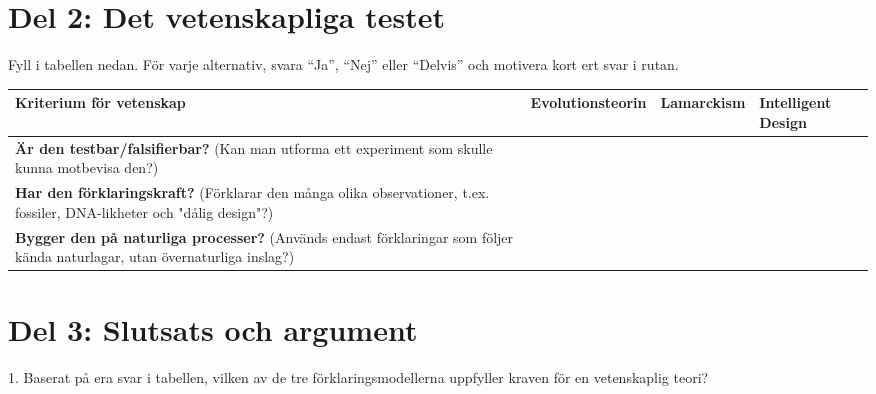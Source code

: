 \documentclass[12pt,a4paper]{article}
\begin{document}
\newpage

\section*{Del 2: Det vetenskapliga testet}

Fyll i tabellen nedan. För varje alternativ, svara ``Ja'', ``Nej'' eller ``Delvis'' och motivera kort ert svar i rutan.

\vspace{1em}


\begin{tabularx}{\textwidth}{|>{\RaggedRight}p{4cm}|L|L|L|}
\hline
\textbf{Kriterium för vetenskap} & \textbf{Evolutionsteorin} & \textbf{Lamarckism} & \textbf{Intelligent Design} \\ \hline

\textbf{Är den testbar/falsifierbar?} \newline \small (Kan man utforma ett experiment som skulle kunna motbevisa den?) & \vspace{4cm} & \vspace{4cm} & \vspace{4cm} \\ \hline

\textbf{Har den förklaringskraft?} \newline \small (Förklarar den många olika observationer, t.ex. fossiler, DNA-likheter och "dålig design"?) & \vspace{4cm} & \vspace{4cm} & \vspace{4cm} \\ \hline

\textbf{Bygger den på naturliga processer?} \newline \small (Används endast förklaringar som följer kända naturlagar, utan övernaturliga inslag?) & \vspace{4cm} & \vspace{4cm} & \vspace{4cm} \\ \hline
\end{tabularx}

\newpage

\section*{Del 3: Slutsats och argument}

1. Baserat på era svar i tabellen, vilken av de tre förklaringsmodellerna uppfyller kraven för en vetenskaplig teori?
\end{document}
